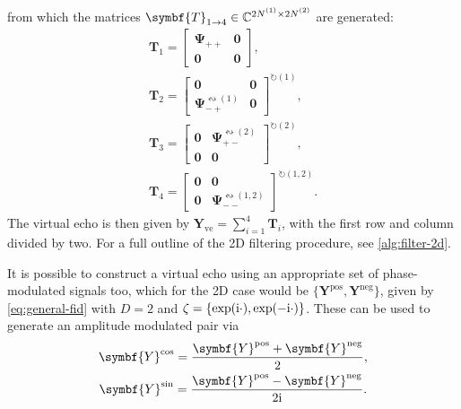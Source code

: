 from which the matrices $\symbf{T}_{1 \rightarrow 4} \in \mathbb{C}^{2 \None
\times 2 \Ntwo}$ are generated:
\begin{subequations}
    \begin{gather}
        \symbf{T}_1 =
        \begin{bmatrix}
            \symbf{\Psi}_{++} & \symbf{0} \\
            \symbf{0} & \symbf{0}
        \end{bmatrix}, \\
        \symbf{T}_2 =
        \begin{bmatrix}
            \symbf{0} & \symbf{0} \\
            \symbf{\Psi}_{-+}^{\leftrightsquigarrow (1)} & \symbf{0}
        \end{bmatrix}^{\circlearrowright (1)}, \\
        \symbf{T}_3 =
        \begin{bmatrix}
            \symbf{0} & \symbf{\Psi}_{+-}^{\leftrightsquigarrow (2)} \\
            \symbf{0} & \symbf{0}
        \end{bmatrix}^{\circlearrowright (2)}, \\
        \symbf{T}_4 =
        \begin{bmatrix}
            \symbf{0} & \symbf{0} \\
            \symbf{0} & \symbf{\Psi}_{--}^{\leftrightsquigarrow (1,2)}
        \end{bmatrix}^{\circlearrowright (1,2)}.
    \end{gather}
\end{subequations}
The virtual echo is then given by $\symbf{Y}_{\text{ve}} = \sum_{i=1}^4
\symbf{T}_i$, with the first row and column divided by two. For a full outline
of the 2D filtering procedure, see \cref{alg:filter-2d}.

It is possible to construct a virtual echo using an appropriate set of
phase-modulated signals too, which for the \ac{2D} case would be $\lbrace
\symbf{Y}^{\text{pos}}, \symbf{Y}^{\text{neg}}\rbrace$, given by
\cref{eq:general-fid} with $D=2$ and  $\zeta = \lbrace \exp(\mathrm{i} \cdot),
\exp(-\mathrm{i}\cdot)\rbrace$. These can be used to generate an amplitude modulated pair via
\begin{subequations}
    \begin{gather}
        \symbf{Y}^{\text{cos}} = \frac{\symbf{Y}^{\text{pos}} + \symbf{Y}^{\text{neg}}}{2},\\
        \symbf{Y}^{\text{sin}} = \frac{\symbf{Y}^{\text{pos}} - \symbf{Y}^{\text{neg}}}{2\iu}.
    \end{gather}
\end{subequations}

